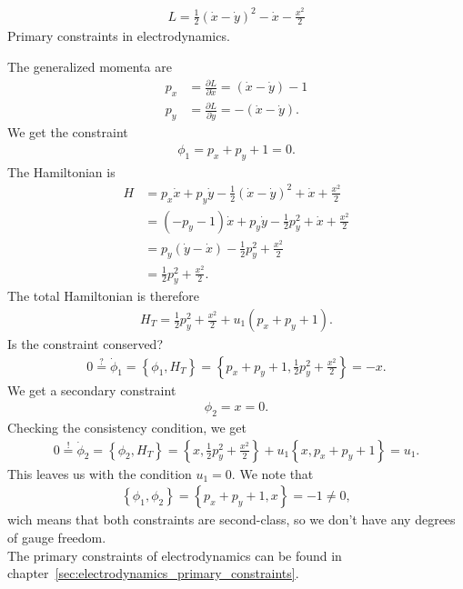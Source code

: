 \begin{exercise}
\begin{align*}
L = \frac{1}{2} (\dot{x} - \dot{y})^2 - \dot{x} - \frac{x^2}{2}
\end{align*}
Primary constraints in electrodynamics.
\end{exercise}
\begin{solution}
The generalized momenta are
\begin{align*}
p_x &= \frac{\partial L}{\partial \dot{x}} = (\dot{x} - \dot{y}) - 1 \\
p_y &= \frac{\partial L}{\partial \dot{y}} = -(\dot{x} - \dot{y}).
\end{align*}
We get the constraint 
\begin{align*}
\phi_1 = p_x + p_y + 1 = 0.
\end{align*}
The Hamiltonian is
\begin{align*}
H &= p_x \dot{x} + p_y \dot{y} - \frac{1}{2} (\dot{x} - \dot{y})^2 + \dot{x} + \frac{x^2}{2} \\
&= (-p_y - 1) \dot{x} + p_y \dot{y} - \frac{1}{2} p_y^2 + \dot{x} + \frac{x^2}{2} \\
&= p_y (\dot{y} - \dot{x}) - \frac{1}{2} p_y^2 + \frac{x^2}{2} \\
&= \frac{1}{2} p_y^2 + \frac{x^2}{2}.
\end{align*}
The total Hamiltonian is therefore
\begin{align*}
H_T = \frac{1}{2} p_y^2 + \frac{x^2}{2} + u_1 (p_x + p_y + 1).
\end{align*}
Is the constraint conserved?
\begin{align*}
0 \overset{?}{=} \dot{\phi}_1 = \left \{ \phi_1,H_T \right \} = \left \{ p_x + p_y + 1, \frac{1}{2} p_y^2 + \frac{x^2}{2} \right \} = - x.
\end{align*}
We get a secondary constraint 
\begin{align*}
\phi_2 = x = 0.
\end{align*}
Checking the consistency condition, we get
\begin{align*}
0 \overset{!}{=} \dot{\phi}_2 = \left \{ \phi_2,H_T \right \} = \left \{ x,\frac{1}{2} p_y^2 + \frac{x^2}{2} \right \} + u_1 \left \{ x,p_x + p_y + 1 \right \} = u_1.
\end{align*}
This leaves us with the condition $u_1 = 0$. We note that 
\begin{align*}
\left \{ \phi_1,\phi_2 \right \} = \left \{ p_x + p_y + 1,x \right \} = - 1 \neq 0,
\end{align*}
wich means that both constraints are second-class, so we don't have any degrees of gauge freedom. \\

The primary constraints of electrodynamics can be found in chapter~\vref{sec:electrodynamics_primary_constraints}.
\end{solution}